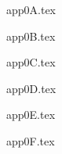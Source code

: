\documentclass[a4paper,11pt,leqno,openbib,11pt,openany,oneside]{memoir} %
\newcommand{\clearemptydoublepage}{\newpage{\thispagestyle{empty}\cleardoublepage}}
\theoremstyle{plain}
\theoremstyle{plain}
\theoremstyle{plain}
\theoremstyle{definition}
\theoremstyle{plain}
\theoremstyle{plain}
\theoremstyle{plain}
\begin{document}


%
%
\appendix
{app0A.tex}

{app0B.tex}

{app0C.tex}

{app0D.tex}

{app0E.tex}

{app0F.tex}

%
%   
\end{document}
